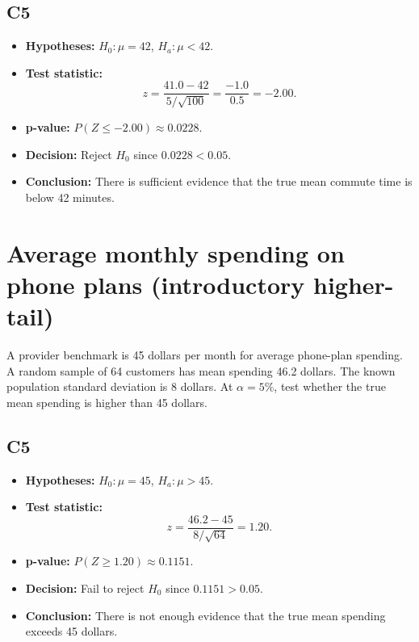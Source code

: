 \subsection*{C5}
\begin{itemize}
    \item \textbf{Hypotheses:} \(H_0\colon \mu=42\), \(H_a\colon \mu<42\).
    \item \textbf{Test statistic:}
    \[
    z=\frac{41.0-42}{5/\sqrt{100}}=\frac{-1.0}{0.5}=-2.00.
    \]
    \item \textbf{p-value:} \(P(Z\le -2.00)\approx 0.0228\).
    \item \textbf{Decision:} Reject \(H_0\) since \(0.0228<0.05\).
    \item \textbf{Conclusion:} There is sufficient evidence that the true mean commute time is below 42 minutes.
\end{itemize}

\begin{center}
\end{center}


\section{Average monthly spending on phone plans (introductory higher-tail)}
A provider benchmark is 45 dollars per month for average phone-plan spending. A random sample of 64 customers has mean spending 46.2 dollars. The known population standard deviation is 8 dollars. At \(\alpha=5\%\), test whether the true mean spending is higher than 45 dollars.

\subsection*{C5}
\begin{itemize}
    \item \textbf{Hypotheses:} \(H_0\colon \mu=45\), \(H_a\colon \mu>45\).
    \item \textbf{Test statistic:}
    \[
    z=\frac{46.2-45}{8/\sqrt{64}}=1.20.
    \]
    \item \textbf{p-value:} \(P(Z\ge 1.20)\approx 0.1151\).
    \item \textbf{Decision:} Fail to reject \(H_0\) since \(0.1151>0.05\).
    \item \textbf{Conclusion:} There is not enough evidence that the true mean spending exceeds 45 dollars.
\end{itemize}

